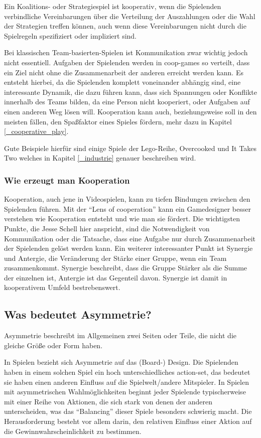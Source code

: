 Ein Koalitions- oder Strategiespiel ist kooperativ, wenn die Spielenden verbindliche Vereinbarungen über die Verteilung der Auszahlungen oder die Wahl der Strategien treffen können, auch wenn diese Vereinbarungen nicht durch die Spielregeln spezifiziert oder impliziert sind\cite{_introduction_to_the_theory_of_cooperative_games}.

Bei klassischen Team-basierten-Spielen ist Kommunikation zwar wichtig jedoch nicht essentiell. Aufgaben der Spielenden werden in coop-games so verteilt, dass ein Ziel nicht ohne die Zusammenarbeit der anderen erreicht werden kann. Es entsteht hierbei, da die Spielenden komplett voneinander abhängig sind, eine interessante Dynamik, die dazu führen kann, dass sich Spannungen oder Konflikte innerhalb des Teams bilden, da eine Person nicht kooperiert, oder Aufgaben auf einen anderen Weg lösen will. Kooperation kann auch, beziehungsweise soll in den meisten fällen, den Spaßfaktor eines Spieles fördern, mehr dazu in Kapitel \ref{_cooperative_play}.

Gute Beispiele hierfür sind einige Spiele der Lego-Reihe, Overcooked und It Takes Two welches in Kapitel \ref{_industrie} genauer beschreiben wird.

\subsubsection{Wie erzeugt man Kooperation}
Kooperation, auch jene in Videospielen, kann zu tiefen Bindungen zwischen den Spielenden führen.
Mit der "`Lens of cooperation"'\cite[S. 311]{_gamemechanics_for_cooperative_games} kann ein Gamedesigner besser verstehen wie Kooperation entsteht und wie man sie fördert. Die wichtigsten Punkte, die Jesse Schell hier anspricht, sind die Notwendigkeit von Kommunikation oder die Tatsache, dass eine Aufgabe nur durch Zusammenarbeit der Spielenden gelöst werden kann. Ein weiterer interessanter Punkt ist Synergie und Antergie, die Veränderung der Stärke einer Gruppe, wenn ein Team zusammenkommt. Synergie beschreibt, dass die Gruppe Stärker als die Summe der einzelnen ist, Antergie ist das Gegenteil davon. Synergie ist damit in kooperativem Umfeld bestrebenswert.

\subsection{Was bedeutet Asymmetrie?}

Asymmetrie beschreibt im Allgemeinen zwei Seiten oder Teile, die nicht die gleiche Größe oder Form haben\cite{_oxford_dict}.

In Spielen bezieht sich Asymmetrie auf das (Board-) Design. Die Spielenden haben in einem solchen Spiel ein hoch unterschiedliches action-set, das bedeutet sie haben einen anderen Einfluss auf die Spielwelt/andere Mitspieler. In Spielen mit asymmetrischen Wahlmöglichkeiten beginnt jeder Spielende typischerweise mit einer Reihe von Aktionen, die sich stark von denen der anderen unterscheiden, was das "`Balancing"' dieser Spiele besonders schwierig macht. Die Herausforderung besteht vor allem darin, den relativen Einfluss einer Aktion auf die Gewinnwahrscheinlichkeit zu bestimmen\cite[S. 18]{_balancing_asymmetric_video_games}.
